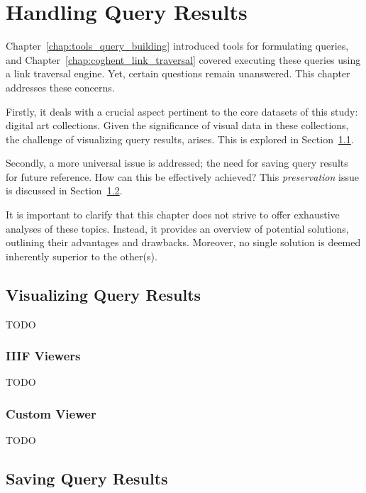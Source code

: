 \chapter{Handling Query Results}
\label{chap:handling_query_results}

Chapter~\ref{chap:tools_query_building} introduced tools for formulating queries, and Chapter~\ref{chap:coghent_link_traversal} covered executing these queries using a link traversal engine. Yet, certain questions remain unanswered. This chapter addresses these concerns.

Firstly, it deals with a crucial aspect pertinent to the core datasets of this study: digital art collections. Given the significance of visual data in these collections, the challenge of visualizing query results, arises. This is explored in Section~\ref{sec:visualizing_query_results}.

Secondly, a more universal issue is addressed; the need for saving query results for future reference. How can this be effectively achieved? This \textit{preservation} issue is discussed in Section~\ref{sec:saving_query_results}.

It is important to clarify that this chapter does not strive to offer exhaustive analyses of these topics. Instead, it provides an overview of potential solutions, outlining their advantages and drawbacks. Moreover, no single solution is deemed inherently superior to the other(s).

\section{Visualizing Query Results}
\label{sec:visualizing_query_results}

TODO

\subsection{IIIF Viewers}

TODO


\subsection{Custom Viewer}

TODO

\section{Saving Query Results}
\label{sec:saving_query_results}

